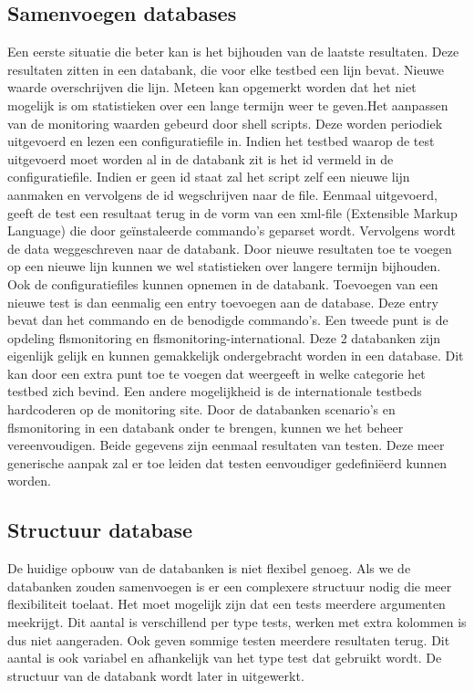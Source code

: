 \subsection{Samenvoegen databases}
\npar
Een eerste situatie die beter kan is het bijhouden van de laatste resultaten.
Deze resultaten zitten in een databank, die voor elke testbed een lijn bevat. Nieuwe waarde overschrijven die lijn. Meteen kan opgemerkt worden dat het niet mogelijk is om statistieken over een lange termijn weer te geven.Het aanpassen van de monitoring waarden gebeurd door shell scripts. Deze worden periodiek uitgevoerd en lezen een configuratiefile in. Indien het testbed waarop de test uitgevoerd moet worden al in de databank zit is het id vermeld in de configuratiefile. Indien er geen id staat zal het script zelf een nieuwe lijn aanmaken en vervolgens de id wegschrijven naar de file. Eenmaal uitgevoerd, geeft de test een resultaat terug in de vorm van een xml-file (Extensible Markup Language) die door ge\"instaleerde commando's geparset wordt. Vervolgens wordt de data weggeschreven naar de databank.
\npar
Door nieuwe resultaten toe te voegen op een nieuwe lijn kunnen we wel statistieken over langere termijn bijhouden.
Ook de configuratiefiles kunnen opnemen in de databank. Toevoegen van een nieuwe test is dan eenmalig een entry toevoegen aan de database.
Deze entry bevat dan het commando en de benodigde commando's.
\npar
Een tweede punt is de opdeling flsmonitoring en flsmonitoring-international. Deze 2 databanken zijn eigenlijk gelijk en kunnen gemakkelijk ondergebracht worden in een database.
Dit kan door een extra punt toe te voegen dat weergeeft in welke categorie het testbed zich bevind. Een andere mogelijkheid is de internationale testbeds hardcoderen op de monitoring site.
\npar
Door de databanken scenario's en flsmonitoring in een databank onder te brengen, kunnen we het beheer vereenvoudigen.
Beide gegevens zijn eenmaal resultaten van testen. Deze meer generische aanpak zal er toe leiden dat testen eenvoudiger gedefini\"eerd kunnen worden.

\subsection{Structuur database}
\npar
De huidige opbouw van de databanken is niet flexibel genoeg. Als we de databanken zouden samenvoegen is er een complexere structuur nodig die meer flexibiliteit toelaat.
Het moet mogelijk zijn dat een tests meerdere argumenten meekrijgt. Dit aantal is verschillend per type tests, werken met extra kolommen is dus niet aangeraden.
Ook geven sommige testen meerdere resultaten terug. Dit aantal is ook variabel en afhankelijk van het type test dat gebruikt wordt.
De structuur van de databank wordt later in uitgewerkt.

